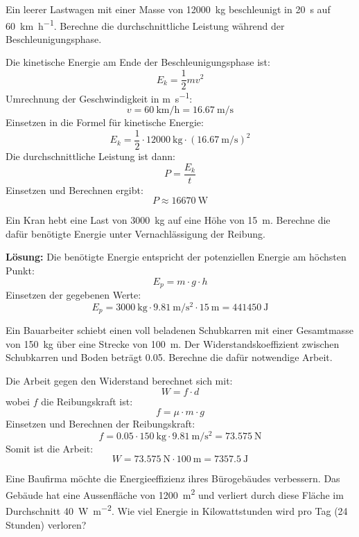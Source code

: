 \begin{questions}
\question
Ein leerer Lastwagen mit einer Masse von \SI{12000}{\kilo\gram} beschleunigt in \SI{20}{\second} auf \SI{60}{\kilo\meter\per\hour}. Berechne die durchschnittliche Leistung während der Beschleunigungsphase.

\begin{solution}
Die kinetische Energie am Ende der Beschleunigungsphase ist:
\[ E_k = \frac{1}{2} m v^2 \]
Umrechnung der Geschwindigkeit in \si{\meter\per\second}:
\[ v = \SI{60}{\kilo\meter\per\hour} = \SI{16.67}{\meter\per\second} \]
Einsetzen in die Formel für kinetische Energie:
\[ E_k = \frac{1}{2} \cdot \SI{12000}{\kilo\gram} \cdot (\SI{16.67}{\meter\per\second})^2 \]
Die durchschnittliche Leistung ist dann:
\[ P = \frac{E_k}{t} \]
Einsetzen und Berechnen ergibt:
\[ P \approx \SI{16670}{\watt} \]
\end{solution}

\question
Ein Kran hebt eine Last von \SI{3000}{\kilo\gram} auf eine Höhe von \SI{15}{\meter}. Berechne die dafür benötigte Energie unter Vernachlässigung der Reibung.

\begin{solution}
\textbf{Lösung:} 
Die benötigte Energie entspricht der potenziellen Energie am höchsten Punkt:
\[ E_p = m \cdot g \cdot h \]
Einsetzen der gegebenen Werte:
\[ E_p = \SI{3000}{\kilo\gram} \cdot \SI{9.81}{\meter\per\second\squared} \cdot \SI{15}{\meter} = \SI{441450}{\joule} \]
\end{solution}

\question
Ein Bauarbeiter schiebt einen voll beladenen Schubkarren mit einer Gesamtmasse von \SI{150}{\kilo\gram} über eine Strecke von \SI{100}{\meter}. Der Widerstandskoeffizient zwischen Schubkarren und Boden beträgt 0.05. Berechne die dafür notwendige Arbeit.

\begin{solution}
Die Arbeit gegen den Widerstand berechnet sich mit:
\[ W = f \cdot d \]
wobei \( f \) die Reibungskraft ist:
\[ f = \mu \cdot m \cdot g \]
Einsetzen und Berechnen der Reibungskraft:
\[ f = 0.05 \cdot \SI{150}{\kilo\gram} \cdot \SI{9.81}{\meter\per\second\squared} = \SI{73.575}{\newton} \]
Somit ist die Arbeit:
\[ W = \SI{73.575}{\newton} \cdot \SI{100}{\meter} = \SI{7357.5}{\joule} \]
\end{solution}

\question
Eine Baufirma möchte die Energieeffizienz ihres Bürogebäudes verbessern. Das Gebäude hat eine Aussenfläche von \SI{1200}{\meter\squared} und verliert durch diese Fläche im Durchschnitt \SI{40}{\watt\per\meter\squared}. Wie viel Energie in Kilowattstunden wird pro Tag (24 Stunden) verloren?


\end{questions}
